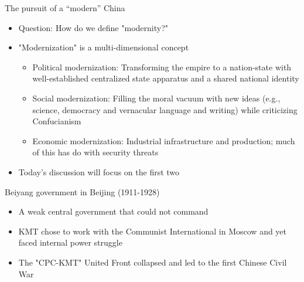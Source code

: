 \documentclass[
  10pt,
  ignorenonframetext,
]{beamer}
\begin{document}
\begin{frame}{The pursuit of a ``modern'' China}
\label{the-pursuit-of-a-modern-china}
\begin{itemize}
  \item Question: How do we define "modernity?"
  \pause
  \vspace{0.3cm}
  \item "Modernization" is a multi-dimensional concept
  \vspace{0.1cm}
  \begin{itemize}
    \item Political modernization: Transforming the empire to a nation-state with well-established centralized state apparatus and a shared national identity
    \item Social modernization: Filling the moral vacuum with new ideas (e.g., science, democracy and vernacular language and writing) while criticizing Confucianism
    \item Economic modernization: Industrial infrastructure and production; much of this has do with security threats
  \end{itemize}
  \vspace{0.3cm}
  \item Today's discussion will focus on the first two
\end{itemize}
\end{frame}

\begin{frame}{Beiyang government in Beijing (1911-1928)}
\label{beiyang-government-in-beijing-1911-1928}
\begin{itemize}
  \item A weak central government that could not command
  \vspace{1cm}
  \item KMT chose to work with the Communist International in Moscow and yet faced internal power struggle
  \vspace{1cm}
  \item The "CPC-KMT" United Front collapsed and led to the first Chinese Civil War
\end{itemize}
\end{frame}
\end{document}
